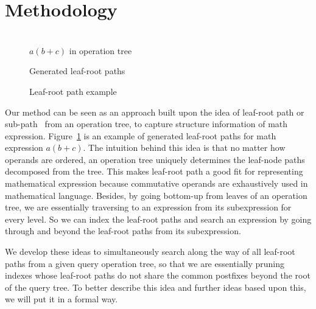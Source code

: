 \documentclass{acm_proc_article-sp}
\begin{document}
\section{Methodology}
\begin{figure}
\begin{minipage}[b]{1.60in}
\begin{center}
\\$a(b+c)$ in operation tree
\end{center}
\end{minipage}
\hspace*{0in}
\begin{minipage}[b]{1.60in}
\begin{center}
Generated leaf-root paths
\end{center}
\end{minipage}
\caption{Leaf-root path example}\label{oprtreeExample}
\end{figure}
Our method can be seen as an approach built upon the idea of leaf-root path or sub-path~\cite{signifjap,MathMLleafroot,signfused,sefobyfo} from an operation tree, to capture structure information of math expression. 
Figure~\ref{oprtreeExample} is an example of generated leaf-root paths for math expression $a(b+c)$.
The intuition behind this idea is that no matter how operands are ordered, an operation tree uniquely determines the leaf-node paths decomposed from the tree.
This makes leaf-root path a good fit for representing mathematical expression because commutative operands are exhaustively used in mathematical language.
Besides, by going bottom-up from leaves of an operation tree, we are essentially traversing to an expression from its subexpression for every level. 
So we can index the leaf-root paths and search an expression by going through and beyond the leaf-root paths from its subexpression.

We develop these ideas to simultaneously search along the way of all leaf-root paths from a given query operation tree, so that we are essentially pruning indexes whose leaf-root paths do not share the common postfixes beyond the root of the query tree.
To better describe this idea and further ideas based upon this, we will put it in a formal way.
\end{document}
